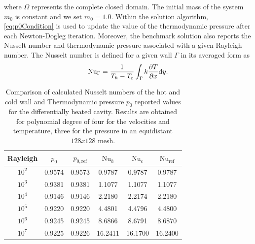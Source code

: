 {\begin{equation}
\end{equation}
where $\Omega$ represents the complete closed domain. The initial mass of the system $m_0$ is constant and we set $m_0 = 1.0$. Within the solution algorithm, \cref{eq:p0Condition} is used to update the value of the thermodynamic pressure after each Newton-Dogleg iteration.
Moreover, the benchmark solution \cite{vierendeelsBenchmarkSolutionsNatural2003} also reports the Nusselt number and thermodynamic pressure associated with a given Rayleigh number. The Nusselt number is defined for a given wall $\Gamma$ in its averaged form as 
\begin{equation}\label{eq:Nusselt}
\text{Nu}_\Gamma = \frac{1}{T_h - T_c}\int_{\Gamma} k \frac{\partial T}{\partial x}\text{d}y.
\end{equation}\begin{table}[t]
	\begin{center}
		\begin{tabular}{cccccc}
			\hline
			Rayleigh & $p_0$ &  $p_{0,\text{ref}}$  &$\text{Nu}_{h}$ & $\text{Nu}_{c}$& $\text{Nu}_{\text{ref}}$ \\ \hline
			\parbox[0pt][13pt][c]{0pt}{}$10^2$   & 0.9574 & 0.9573 & 0.9787    & 0.9787 & 0.9787      \\
			$10^3$   & 0.9381 & 0.9381 & 1.1077    & 1.1077  & 1.1077      \\
			$10^4$   & 0.9146 & 0.9146 & 2.2180    & 2.2174  & 2.2180      \\
			$10^5$   & 0.9220 & 0.9220 & 4.4801    & 4.4796   & 4.4800      \\
			$10^6$   & 0.9245 & 0.9245 & 8.6866    & 8.6791  & 8.6870      \\
			$10^7$   & 0.9225 & 0.9226 & 16.2411   & 16.1700 & 16.2400     \\ \hline
		\end{tabular}
	\end{center}
	\caption[Differentially heated cavity: Results of Nusselt number and Thermodynamic pressure]{Comparison of calculated Nusselt numbers of the hot and cold wall and Thermodynamic pressure $p_0$ reported values\cite{vierendeelsBenchmarkSolutionsNatural2003} for the differentially heated cavity. Results are obtained for polynomial degree of four for the velocities and temperature, three for the pressure in an equidistant $128x128$ mesh.}
	\label{tab:p0_Nu_Results}
\end{table}
}
